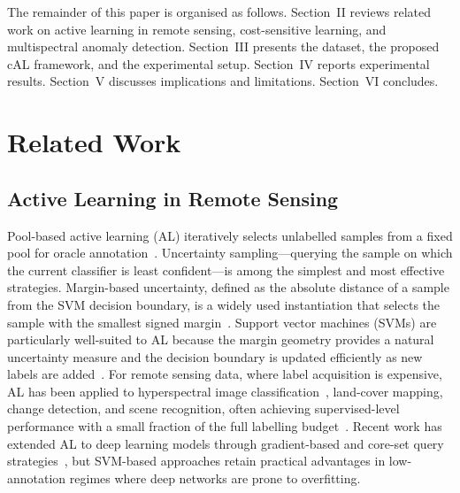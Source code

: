 \documentclass[lettersize,journal]{IEEEtran}
\begin{document}
The remainder of this paper is organised as follows.
Section~II reviews related work on active learning in remote sensing,
cost-sensitive learning, and multispectral anomaly detection.
Section~III presents the dataset, the proposed cAL framework, and the
experimental setup.
Section~IV reports experimental results.
Section~V discusses implications and limitations.
Section~VI concludes.

\section{Related Work}

\subsection{Active Learning in Remote Sensing}

Pool-based active learning (AL) iteratively selects unlabelled samples from a
fixed pool for oracle annotation~\cite{settles2012active}. Uncertainty
sampling---querying the sample on which the current classifier is least
confident---is among the simplest and most effective strategies.
Margin-based uncertainty, defined as the absolute distance of a sample
from the SVM decision boundary, is a widely used instantiation that
selects the sample with the smallest signed margin~\cite{tong2001support}.
Support vector machines (SVMs) are particularly well-suited to AL because
the margin geometry provides a natural uncertainty measure and the
decision boundary is updated efficiently as new labels are
added~\cite{mountrakis2011svms,chang2011libsvm}.
For remote sensing data, where label acquisition is expensive, AL has been
applied to hyperspectral image classification~\cite{li2013rs}, land-cover
mapping, change detection, and scene recognition, often achieving
supervised-level performance with a small fraction of the full labelling
budget~\cite{tuia2011survey,crawford2013active,guo2023active,gunes2026geoai}.
Recent work has extended AL to deep learning models through
gradient-based and core-set query strategies~\cite{ash2020deep,sener2018active},
but SVM-based approaches retain practical advantages in low-annotation
regimes where deep networks are prone to overfitting.
\end{document}
